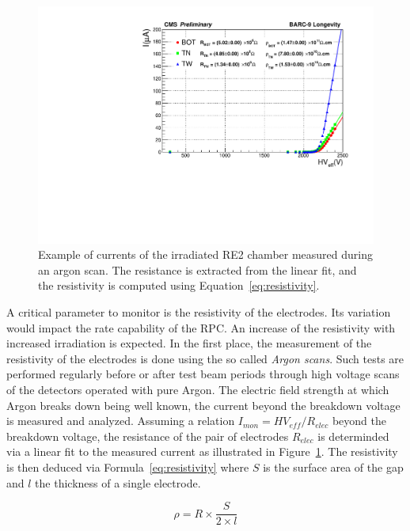 	\begin{figure}
		\centering
    	\includegraphics[width = \linewidth]{fig/chapt5/Argon-Scan.pdf}
		\caption{\label{fig:argon-scan} Example of currents of the irradiated RE2 chamber measured during an argon scan. The resistance is extracted from the linear fit, and the resistivity is computed using Equation~\ref{eq:resistivity}.}
	\end{figure}
	
	A critical parameter to monitor is the resistivity of the electrodes. Its variation would impact the rate capability of the RPC. An increase of the resistivity with increased irradiation is expected. In the first place, the measurement of the resistivity of the electrodes is done using the so called \textit{Argon scans}. Such tests are performed regularly before or after test beam periods through high voltage scans of the detectors operated with pure Argon. The electric field strength at which Argon breaks down being well known, the current beyond the breakdown voltage is measured and analyzed. Assuming a relation $I_{mon} = HV_{eff}/R_{elec}$ beyond the breakdown voltage, the resistance of the pair of electrodes $R_{elec}$ is determinded via a linear fit to the measured current as illustrated in Figure~\ref{fig:argon-scan}. The resistivity is then deduced via Formula~\ref{eq:resistivity} where $S$ is the surface area of the gap and $l$ the thickness of a single electrode.
	
\endgroup
	
	\begin{equation}
	\label{eq:resistivity}
	\rho = R \times \frac{S}{2 \times l}
	\end{equation}
	
